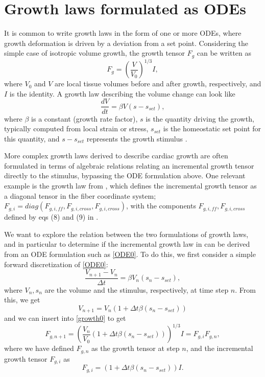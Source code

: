 \documentclass[a4paper,10pt]{article}
\begin{document}
\section{Growth laws formulated as ODEs}
It is common to write growth laws in the form of one or more ODEs, where growth deformation is driven by a deviation
from a set point. Considering the simple case of isotropic volume growth, the growth tensor $F_g$ can be written as
\begin{equation}
F_g = \left(\frac{V}{V_0}\right)^{1/3} I,
\label{growth0}\end{equation}
where $V_0$ and $V$ are local tissue volumes before and after growth, respectively, and $I$ is the identity. 
A growth law describing the volume change can look like 
\begin{equation}
\frac{dV}{dt} = \beta V (s-s_{set}) ,
\label{ODE0}\end{equation}
where $\beta$ is a constant (growth rate factor), $s$ is the quantity driving the growth, typically computed from 
local strain or stress, $s_{set}$ is the homeostatic set point for this quantity, and $s-s_{set}$ represents
the growth stimulus \cite{Kroon2009BMM}. 

More complex growth laws derived to describe cardiac growth are often formulated in terms of algebraic 
relations relating an incremental growth tensor directly to the stimulus, bypassing the ODE formulation above. 
One relevant example is the growth law from \cite{Kerckhoffs2012MRC}, which defines the
incremental growth tensor as a diagonal tensor in the fiber coordinate system;
$F_{g,i}= diag(F_{g,i,ff}, F_{g,i,cross}, F_{g,i,cross})$, with the components 
$F_{g,i,ff}, F_{g,i,cross}$ defined by eqs (8) and (9) in \cite{Kerckhoffs2012MRC}. 

We want to explore the relation between the two formulations of growth laws, and in particular
to determine if the incremental growth law in \cite{Kerckhoffs2012MRC} can be derived 
from an ODE formulation such as \eqref{ODE0}. To do this, we first consider a simple forward
discretization of \eqref{ODE0}:
\[
\frac{V_{n+1} - V_{n}}{\Delta t} = \beta V_n (s_n-s_{set}),
\]
where $V_n, s_n$ are the volume and the stimulus, respectively, at time step $n$. From this, we
get
\[
V_{n+1} = V_n (1 + \Delta t \beta (s_n-s_{set}))
\]
and we can insert into \eqref{growth0} to get
\[
F_{g,n+1} = \left(\frac{V_n}{V_0}(1 + \Delta t \beta (s_n-s_{set}))\right)^{1/3} I = F_{g,i} F_{g,n},
\]
where we have defined $F_{g,n}$ as the growth tensor at step $n$, and the incremental growth tensor $F_{g,i}$ as
\[
  F_{g,i} = (1 + \Delta t \beta (s_n-s_{set})) I .
\]
\end{document}
